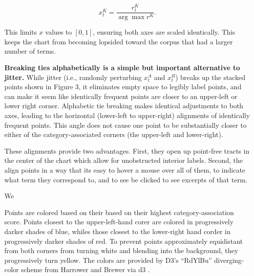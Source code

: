 \documentclass[11pt]{article}
\begin{document}
\vspace{-.2cm}
$$x^{K}_t = \frac{r^{K}_t}{\arg\!\max r^{K}}.$$
\vspace{-.2cm}

This limits $x$ values to $[0,1]$, ensuring both axes are scaled identically.  This keeps the chart from becoming lopsided toward the corpus that had a larger number of terms. 

\textbf{Breaking ties alphabetically is a simple but important alternative to jitter.} While jitter (i.e., randomly perturbing $x_{t}^{A}$ and $x_{t}^{B}$) breaks up the stacked points shown in Figure 3, it eliminates empty space to legibly label points, and can make it seem like identically frequent points are closer to an upper-left or lower right corner.  Alphabetic tie breaking makes identical adjustments to both axes, leading to the horizontal (lower-left to upper-right) alignments of identically frequent points.  This angle does not cause one point to be substantially closer to either of the category-associated corners (the upper-left and lower-right). 

These alignments provide two advantages. First, they open up point-free tracts in the center of the chart which allow for unobstructed interior labels. Second, the align points in a way that its easy to hover a mouse over all of them, to indicate what term they correspond to, and to see be clicked to see excerpts of that term.

We 

Points are colored based on their based on their highest category-association score.  Points closest to the upper-left-hand corer are colored in progressively darker shades of blue, whiles those closest to the lower-right hand corder in progressively darker shades of red.  To prevent points approximately equidistant from both corners from turning white and blending into the background, they progressively turn yellow.  The colors are provided by D3's ``RdYlBu'' diverging-color scheme from Harrower and Brewer \cite{colorbrewer} via d3 \cite{d3}.
\end{document}
